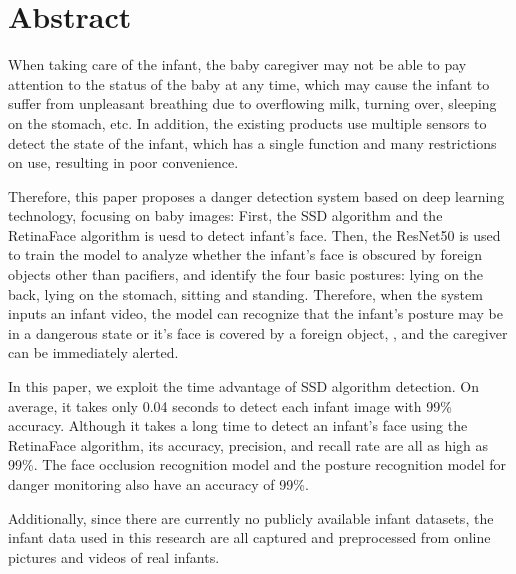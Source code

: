 \documentclass[class=NCU_thesis, crop=false]{standalone}
\begin{document}
\chapter{Abstract}
When taking care of the infant, the baby caregiver may not be able to pay attention to the status of the baby at any time, 
which may cause the infant to suffer from unpleasant breathing due to overflowing milk, turning over, sleeping on the stomach, etc. 
In addition, the existing products use multiple sensors to detect the state of the infant, which has a single function and many restrictions on use, 
resulting in poor convenience.

Therefore, this paper proposes a danger detection system based on deep learning technology, focusing on baby images: 
First, the SSD algorithm and the RetinaFace algorithm is uesd to detect infant's face.
Then, the ResNet50 is used to train the model to analyze whether the infant's face is obscured by foreign objects other than pacifiers, and identify the four basic postures: lying on the back, lying on the stomach, sitting and standing.
Therefore, when the system inputs an infant video, the model can recognize that the infant's posture may be in a dangerous state or it's face is covered by a foreign object, , and the caregiver can be immediately alerted. 

In this paper, we exploit the time advantage of SSD algorithm detection. 
On average, it takes only 0.04 seconds to detect each infant image with 99\% accuracy.
Although it takes a long time to detect an infant's face using the RetinaFace algorithm, its accuracy, precision, and recall rate are all as high as 99\%. 
The face occlusion recognition model and the posture recognition model for danger monitoring also have an accuracy of 99\%.

Additionally, since there are currently no publicly available infant datasets, the infant data used in this research are all captured and preprocessed from online pictures and videos of real infants.



\end{document}
